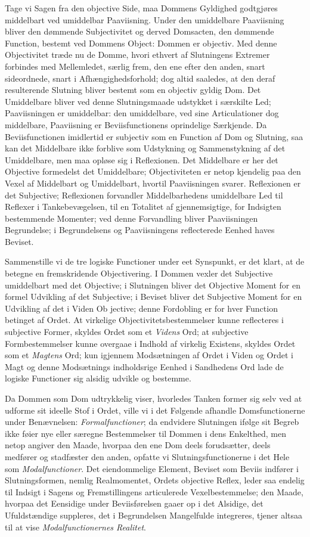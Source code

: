 \documentclass[12pt]{book}
\newcommand{\opage}[1]{\marginnote{\footnotesize\textit{[#1]}}}
\begin{document}
Tage vi Sagen fra den objective Side, maa Dommens
Gyldighed godtgjøres middelbart ved umiddelbar Paaviisning.
Under den umiddelbare Paaviisning bliver den dømmende Subjectivitet
og derved Domsacten, den dømmende Function,
bestemt ved Dommens Object: Dommen er objectiv. Med
denne Objectivitet træde nu de Domme, hvori ethvert af
Slutningens Extremer forbindes med Mellemledet, særlig frem,
den ene efter den anden, snart sideordnede, snart i Afhængighedsforhold;
dog altid saaledes, at den deraf resulterende
Slutning bliver bestemt som en objectiv gyldig Dom. Det
Umiddelbare bliver ved denne Slutningsmaade udstykket i
særskilte Led; Paaviisningen er umiddelbar: den umiddelbare,
ved sine Articulationer dog middelbare, Paaviisning er Beviisfunctionens
oprindelige Særkjende. Da Beviisfunctionen
imidlertid er subjectiv som en Function af Dom og Slutning,
saa kan det Middelbare ikke forblive som Udstykning og Sammenstykning
af det Umiddelbare, men maa opløse sig i Reflexionen.
Det Middelbare er her det Objective formedelst
det Umiddelbare; Objectiviteten er netop kjendelig paa den Vexel
af Middelbart og Umiddelbart, hvortil Paaviisningen svarer.
Reflexionen er det Subjective; Reflexionen forvandler Middelbarhedens
umiddelbare Led til Reflexer i Tankebevægelsen, til
en Totalitet af gjennemsigtige, for Indsigten bestemmende
Momenter; ved denne Forvandling bliver Paaviisningen Begrundelse;
i Begrundelsens og Paaviisningens reflecterede Eenhed
haves Beviset.

Sammenstille vi de tre logiske Functioner under eet
Synspunkt, er det klart, at de betegne en fremskridende Objectivering.
I Dommen vexler det Subjective umiddelbart
med det Objective; i Slutningen bliver det Objective Moment
for en formel Udvikling af det Subjective; i Beviset bliver
det Subjective Moment for en Udvikling af det i Viden Ob%
\opage{17}jective; denne Fordobling er for hver Function betinget af
Ordet. At virkelige Objectivitetsbestemmelser kunne reflecteres
i subjective Former, skyldes Ordet som et \emph{Videns} Ord; at
subjective Formbestemmelser kunne overgaae i Indhold af virkelig
Existens, skyldes Ordet som et \emph{Magtens} Ord; kun
igjennem Modsætningen af Ordet i Viden og Ordet i Magt
og denne Modsætnings indholdsrige Eenhed i Sandhedens
Ord lade de logiske Functioner sig alsidig udvikle og bestemme.

Da Dommen som Dom udtrykkelig viser, hvorledes Tanken
former sig selv ved at udforme sit ideelle Stof i Ordet, ville
vi i det Følgende afhandle Domsfunctionerne under Benævnelsen:
\emph{Formalfunctioner}; da endvidere Slutningen
ifølge sit Begreb ikke føier nye eller særegne Bestemmelser
til Dommen i dens Enkelthed, men netop angiver den Maade,
hvorpaa den ene Dom deels forudsætter, deels medfører og
stadfæster den anden, opfatte vi Slutningsfunctionerne i det
Hele som \emph{Modalfunctioner}. Det eiendommelige Element,
Beviset som Beviis indfører i Slutningsformen, nemlig Realmomentet,
Ordets objective Reflex, leder saa endelig til
Indsigt i Sagens og Fremstillingens articulerede Vexelbestemmelse;
den Maade, hvorpaa det Eensidige under Beviisførelsen
gaaer op i det Alsidige, det Ufuldstændige suppleres,
det i Begrundelsen Mangelfulde integreres, tjener altsaa til
at vise \emph{Modalfunctionernes Realitet}.
\end{document}
